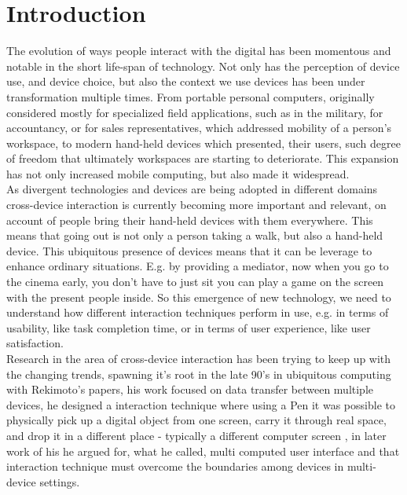 \section{Introduction} \label{sec:introduction}
The evolution of ways people interact with the digital has been momentous and notable in the short life-span of technology. Not only has the perception of device use, and device choice, but also the context we use devices has been under transformation multiple times. From portable personal computers, originally considered mostly for specialized field applications, such as in the military, for accountancy, or for sales representatives, which addressed mobility of a person's workspace, to modern hand-held devices which presented, their users, such degree of freedom that ultimately workspaces are starting to deteriorate. This expansion has not only increased mobile computing, but also made it widespread. \\

As divergent technologies and devices are being adopted in different domains cross-device interaction is currently becoming more important and relevant, on account of people bring their hand-held devices with them everywhere. This means that going out is not only a person taking a walk, but also a hand-held device. This ubiquitous presence of devices means that it can be leverage to enhance ordinary situations. E.g. by providing a mediator, now when you go to the cinema early, you don't have to just sit you can play a game on the screen with the present people inside. So this emergence of new technology, we need to understand how different interaction techniques perform in use, e.g. in terms of usability, like task completion time, or in terms of user experience, like user satisfaction. \\

Research in the area of cross-device interaction has been trying to keep up with the changing trends, spawning it's root in the late 90's in ubiquitous computing with Rekimoto's papers, his work focused on data transfer between multiple devices, he designed a interaction technique where using a Pen it was possible to physically pick up a digital object from one screen, carry it through real space, and drop it in a different place - typically a different computer screen \cite{Rekimoto:1997}, in later work of his he argued for, what he called, multi computed user interface and that interaction technique must overcome the boundaries among devices in multi-device settings\cite{Rekimoto:1998}.

